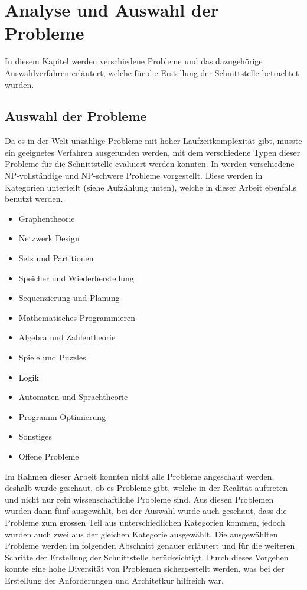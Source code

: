 %
%

\chapter{Analyse und Auswahl der Probleme}\label{chap.problemauswahl}
In diesem Kapitel werden verschiedene Probleme und das dazugehörige Auswahlverfahren erläutert, welche für die Erstellung der Schnittstelle betrachtet wurden.

\section{Auswahl der Probleme}\label{cat_theo_inf}
Da es in der Welt unzählige Probleme mit hoher Laufzeitkomplexität gibt, musste ein geeignetes Verfahren ausgefunden werden, mit dem verschiedene Typen dieser Probleme für die Schnittstelle evaluiert werden konnten. In \cite{garey1979computers} werden verschiedene NP-vollständige und NP-schwere Probleme vorgestellt. Diese werden in Kategorien unterteilt (siehe Aufzählung unten), welche in dieser Arbeit ebenfalls benutzt werden.

\begin{itemize}
	\item Graphentheorie
	\item Netzwerk Design
	\item Sets und Partitionen
	\item Speicher und Wiederherstellung
	\item Sequenzierung und Planung
	\item Mathematisches Programmieren
	\item Algebra und Zahlentheorie
	\item Spiele und Puzzles
	\item Logik
	\item Automaten und Sprachtheorie
	\item Programm Optimierung
	\item Sonstiges
	\item Offene Probleme
\end{itemize}

Im Rahmen dieser Arbeit konnten nicht alle Probleme angeschaut werden, deshalb wurde geschaut, ob es Probleme gibt, welche in der Realität auftreten und nicht nur rein wissenschaftliche Probleme sind. Aus diesen Problemen wurden dann fünf ausgewählt, bei der Auswahl wurde auch geschaut, dass die Probleme zum grossen Teil aus unterschiedlichen Kategorien kommen, jedoch wurden auch zwei aus der gleichen Kategorie ausgewählt. Die ausgewählten Probleme werden im folgenden Abschnitt genauer erläutert und für die weiteren Schritte der Erstellung der Schnittstelle berücksichtigt. Durch dieses Vorgehen konnte eine hohe Diversität von Problemen sichergestellt werden, was bei der Erstellung der Anforderungen und Architetkur hilfreich war.

